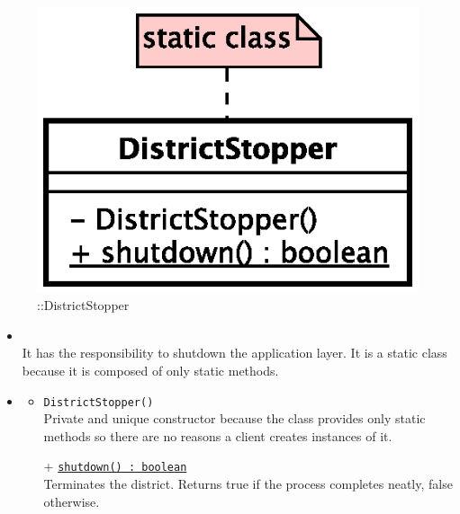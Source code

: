 \begin{figure}[h]
\centering
\includegraphics[scale=0.6,keepaspectratio]{images/solution/app/backend/district_stopper.eps}
\caption{\pReactive::DistrictStopper}
\label{fig:sd-app-district-stopper}
\end{figure}
\FloatBarrier
\begin{itemize}
  \item \textbf{\descr} \\
  It has the responsibility to shutdown the application layer.
  It is a static class because it is composed of only static methods.
  \item \textbf{\ops}
  \begin{itemize}
    \item \texttt{DistrictStopper()} \\
    Private and unique constructor because the class provides only static methods 
    so there are no reasons a client creates instances of it.
    \item[+] \texttt{\underline{shutdown() : boolean}} \\
    Terminates the district. Returns true if the process completes neatly,
    false otherwise.
  \end{itemize}
\end{itemize} 
